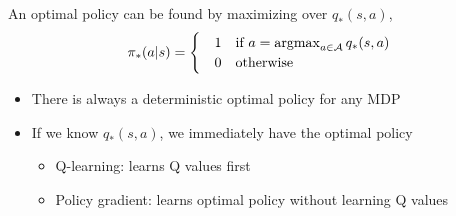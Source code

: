 An optimal policy can be found by maximizing over $q_*(s,a)$, 
\begin{align*}
	\pi_*(a|s) = 
	\begin{cases} 
		&1 \quad \textrm{if } a = \operatorname*{\operatorname{argmax}}_{a\in \mathcal{A}}q_*(s,a)\\
		&0 \quad \textrm{otherwise}
	\end{cases}
\end{align*}
\begin{itemize}
	\item There is always a deterministic optimal policy for any MDP
	\item If we know $q_*(s,a)$, we immediately have the optimal policy 
		\begin{itemize}
			\item Q-learning: learns Q values first
			\item Policy gradient: learns optimal policy without learning Q values
		\end{itemize}
\end{itemize}

